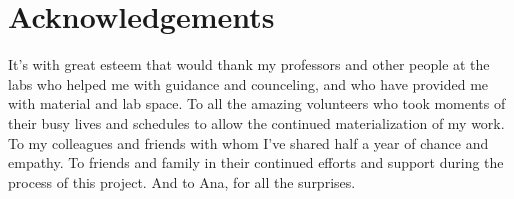 \chapter*{Acknowledgements}
It's with great esteem that would thank my professors and other people at the labs who helped me with guidance and counceling, and who have provided me with material and lab space. To all the amazing volunteers who took moments of their busy lives and schedules to allow the continued materialization of my work. To my colleagues and friends with whom I've shared half a year of chance and empathy. To friends and family in their continued efforts and support during the process of this project. And to Ana, for all the surprises.

\vspace{10mm}
\flushleft{\vartextAuthor}